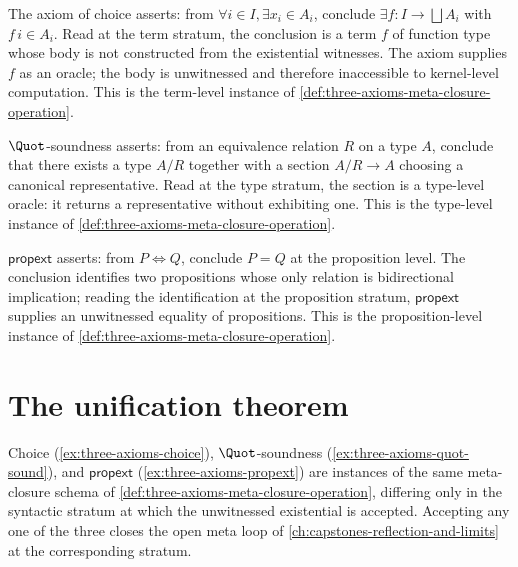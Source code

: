 \begin{example}
\label{ex:three-axioms-choice}
The axiom of choice asserts: from $\forall i \in I, \exists x_i \in A_i$, conclude $\exists f \colon I \to \bigsqcup A_i$ with $f\,i \in A_i$. Read at the term stratum, the conclusion is a term $f$ of function type whose body is not constructed from the existential witnesses. The axiom supplies $f$ as an oracle; the body is unwitnessed and therefore inaccessible to kernel-level computation. This is the term-level instance of \autoref{def:three-axioms-meta-closure-operation}.
\end{example}

\begin{example}
\label{ex:three-axioms-quot-sound}
$\Quot$-soundness asserts: from an equivalence relation $R$ on a type $A$, conclude that there exists a type $A / R$ together with a section $A / R \to A$ choosing a canonical representative. Read at the type stratum, the section is a type-level oracle: it returns a representative without exhibiting one. This is the type-level instance of \autoref{def:three-axioms-meta-closure-operation}.
\end{example}

\begin{example}
\label{ex:three-axioms-propext}
$\mathsf{propext}$ asserts: from $P \Leftrightarrow Q$, conclude $P = Q$ at the proposition level. The conclusion identifies two propositions whose only relation is bidirectional implication; reading the identification at the proposition stratum, $\mathsf{propext}$ supplies an unwitnessed equality of propositions. This is the proposition-level instance of \autoref{def:three-axioms-meta-closure-operation}.
\end{example}

\section{The unification theorem}
\label{sec:three-axioms-unification}

\begin{theorem}
\label{thm:three-axioms-unification}
Choice (\autoref{ex:three-axioms-choice}), $\Quot$-soundness (\autoref{ex:three-axioms-quot-sound}), and $\mathsf{propext}$ (\autoref{ex:three-axioms-propext}) are instances of the same meta-closure schema of \autoref{def:three-axioms-meta-closure-operation}, differing only in the syntactic stratum at which the unwitnessed existential is accepted. Accepting any one of the three closes the open meta loop of \autoref{ch:capstones-reflection-and-limits} at the corresponding stratum.
\end{theorem}

